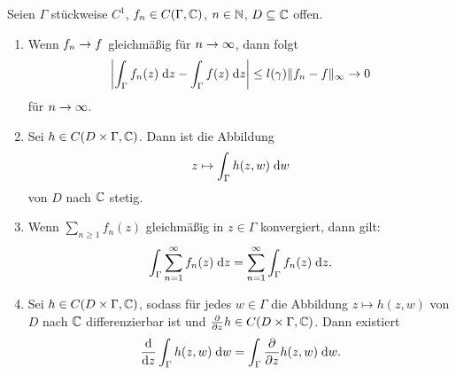\documentclass[a4paper,twoside,DIV15,BCOR12mm]{scrbook}
\begin{document}
\begin{satz}\label{satz2.7}
Seien $\Gamma$ stückweise $C^1$, $f_n\in C(\Gamma,\mathbb{C})$, $n\in\mathbb{N}$, $D\subseteq\mathbb{C}$ offen.
\begin{enumerate}
\item Wenn $f_n\rightarrow f$ gleichmäßig für $n\rightarrow\infty$, dann folgt
\[\left\lvert\int_{\Gamma}^{}{f_n(z)}\;\mathrm{d} z-\int_{\Gamma}^{}{f(z)}\;\mathrm{d} z\right\lvert \leq l(\gamma) \|f_n-f\|_\infty\rightarrow 0\]
für $n\rightarrow\infty$.

\item Sei $h\in C(D\times\Gamma,\mathbb{C})$. Dann ist die Abbildung
\[z\mapsto\int_{\Gamma}^{}{h(z,w)}\;\mathrm{d} w\]
von $D$ nach $\mathbb{C}$ stetig.

\item \label{satz2.7:c} Wenn $\displaystyle\sum_{n\geq1}f_n(z)$ gleichmäßig in $z\in\Gamma$ konvergiert, dann gilt:
\[\int_{\Gamma}^{}{\sum_{n=1}^\infty f_n(z)}\;\mathrm{d} z = \sum_{n=1}^\infty\int_{\Gamma}^{}{f_n(z)}\;\mathrm{d} z.\]

\item Sei $h\in C(D\times\Gamma,\mathbb{C})$, sodass für jedes $w\in\Gamma$ die Abbildung $z\mapsto h(z,w)$ von $D$ nach $\mathbb{C}$ differenzierbar ist und $\frac{\partial}{\partial z}h\in C(D\times\Gamma,\mathbb{C})$. Dann existiert
\[\frac{\mathrm{d}}{\mathrm{d} z}\int_{\Gamma}^{}{h(z,w)}\;\mathrm{d} w = \int_{\Gamma}^{}{\frac{\partial}{\partial z}h(z,w)}\;\mathrm{d} w.\]
\end{enumerate}
\end{satz}
\end{document}
